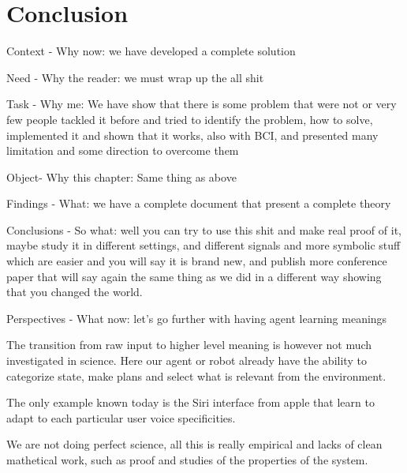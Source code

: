 
\chapter{Conclusion}
\label{chapter:conclusion}
\minitoc


Context - Why now: we have developed a complete solution

Need - Why the reader: we must wrap up the all shit 

Task - Why me: We have show that there is some problem that were not or very few people tackled it before and tried to identify the problem, how to solve, implemented it and shown that it works, also with BCI, and presented many limitation and some direction to overcome them

Object- Why this chapter: Same thing as above

Findings - What: we have a complete document that present a complete theory

Conclusions - So what: well you can try to use this shit and make real proof of it, maybe study it in different settings, and different signals and more symbolic stuff which are easier and you will say it is brand new, and publish more conference paper that will say again the same thing as we did in a different way showing that you changed the world.

Perspectives - What now: let's go further with having agent learning meanings

The transition from raw input to higher level meaning is however not much investigated in science. Here our agent or robot already have the ability to categorize state, make plans and select what is relevant from the environment.

The only example known today is the Siri interface from apple that learn to adapt to each particular user voice specificities.




We are not doing perfect science, all this is really empirical and lacks of clean mathetical work, such as proof and studies of the properties of the system. 

